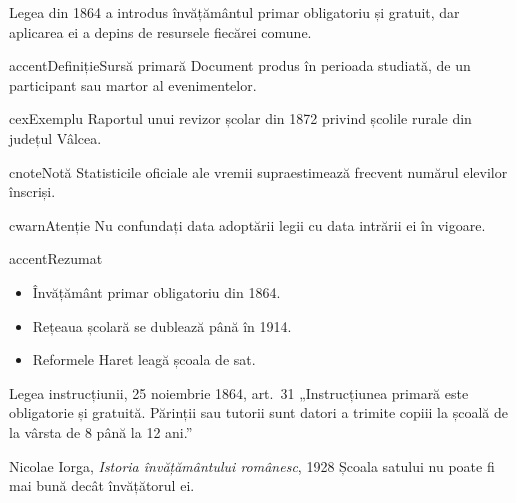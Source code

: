 \documentclass[paper=a4,fontsize=10.5pt,twoside=false,parskip=false]{scrartcl}
\newcommand\Lbl[1]{{\sffamily\footnotesize\color{muted}\addfontfeatures{LetterSpace=8}\MakeUppercase{#1}}}
\begin{document}
\color{ink}
\noindent\Lbl{\StyleName}\par\smallskip
\noindent{\small\color{muted}\StyleNote}\par\bigskip
\noindent Legea din 1864 a introdus învățământul primar obligatoriu și gratuit, dar aplicarea ei a depins de resursele fiecărei comune.
\begin{txbox}{accent}{Definiție}{Sursă primară}
Document produs în perioada studiată, de un participant sau martor al evenimentelor.
\end{txbox}
\begin{txbox}{cex}{Exemplu}{}
Raportul unui revizor școlar din 1872 privind școlile rurale din județul Vâlcea.
\end{txbox}
\begin{txbox}{cnote}{Notă}{}
Statisticile oficiale ale vremii supraestimează frecvent numărul elevilor înscriși.
\end{txbox}
\begin{txbox}{cwarn}{Atenție}{}
Nu confundați data adoptării legii cu data intrării ei în vigoare.
\end{txbox}
\begin{txbox}{accent}{Rezumat}{}
\begin{itemize}\setlength\itemsep{1pt}\item Învățământ primar obligatoriu din 1864. \item Rețeaua școlară se dublează până în 1914. \item Reformele Haret leagă școala de sat.\end{itemize}
\end{txbox}
\begin{txsource}{Legea instrucțiunii, 25 noiembrie 1864, art.~31}
„Instrucțiunea primară este obligatorie și gratuită. Părinții sau tutorii sunt datori a trimite copiii la școală de la vârsta de 8 până la 12 ani.”
\end{txsource}
\begin{txquote}{Nicolae Iorga, \emph{Istoria învățământului românesc}, 1928}
Școala satului nu poate fi mai bună decât învățătorul ei.
\end{txquote}
\end{document}
